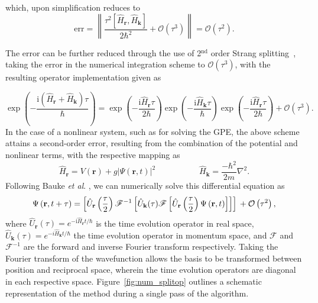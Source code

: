 which, upon simplification reduces to
\begin{equation}
\text{err} = \left\| \frac{\tau^2[{\hat{H}_{\textbf{r}}},{\hat{H}_{\textbf{k}}}]}{2\hbar^2} + \mathcal{O}(\tau^3)\right\| = \mathcal{O}(\tau^2).
\end{equation}

The error can be further reduced through the use of 2$^{\text{nd}}$ order Strang splitting~\cite{NUM:Gradinaru_SIAM_2007}, taking the error in the numerical integration scheme to $\mathcal{O}(\tau^3)$, with the resulting operator implementation given as

\begin{equation}\label{eqn:3}
\exp\left( -\frac{ \textrm{i}\left(\hat{H}_{\textbf{r}} + \hat{H}_{\textbf{k}}\right)\tau}{\hbar} \right) = \exp\left(- \frac{\textrm{i}\hat{H}_{\textbf{r}}\tau}{2\hbar} \right)\exp\left(-\frac{\textrm{i}\hat{H}_{\textbf{k}}\tau}{\hbar}\right)\exp\left( -\frac{\textrm{i}\hat{H}_{\textbf{r}}\tau}{2\hbar}\right) + \mathcal{O}\left(\tau^3\right).
\end{equation}
In the case of a nonlinear system, such as for solving the GPE, the above scheme attains a second-order error, resulting from the combination of the potential and nonlinear terms, with the respective mapping as \cite{BEC:Javanainen_jphysa_2006}
\begin{equation}
\hat{H}_{\textbf{r}} = V(\mathbf{r}) + g\vert\Psi(\mathbf{r},t)\vert^2\; \hspace{5em} \hat{H}_{\textbf{k}} = \frac{-\hbar^2}{2m}\nabla^2.
\end{equation}
Following Bauke \textit{et al}. \cite{Num:Bauke_cpc_2011}, we can numerically solve this differential equation as
\begin{equation}
\Psi\left(\textbf{r},t+\tau\right) = \left[\hat{U}_{\mathbf{r}}\left(\frac{\tau}{2}\right) \mathscr{F}^{-1} \left[ \hat{U}_{\mathbf{k}}(\tau) \mathscr{F} \left[ \hat{U}_{\mathbf{r}}\left(\frac{\tau}{2}\right) \Psi\left(\mathbf{r},t\right) \right] \right] \right]  \\ + \mathcal{O}\left(\tau^2\right),
\end{equation}
where $\hat{U}_{\mathbf{r}}(\tau)=e^{-\textrm{i}\hat{H}_{\mathbf{r}}t/\hbar}$ is the time evolution operator in real space, $\hat{U}_{\mathbf{k}}(\tau)=e^{-i\hat{H}_{\mathbf{k}}t/\hbar}$ the time evolution operator in momentum space, and $\mathscr{F}$ and $\mathscr{F}^{-1}$ are the forward and inverse Fourier transform respectively. Taking the Fourier transform of the wavefunction allows the basis to be transformed between position and reciprocal space, wherein the time evolution operators are diagonal in each respective space. Figure~\ref{fig:num_splitop} outlines a schematic representation of the method during a single pass of the algorithm.

